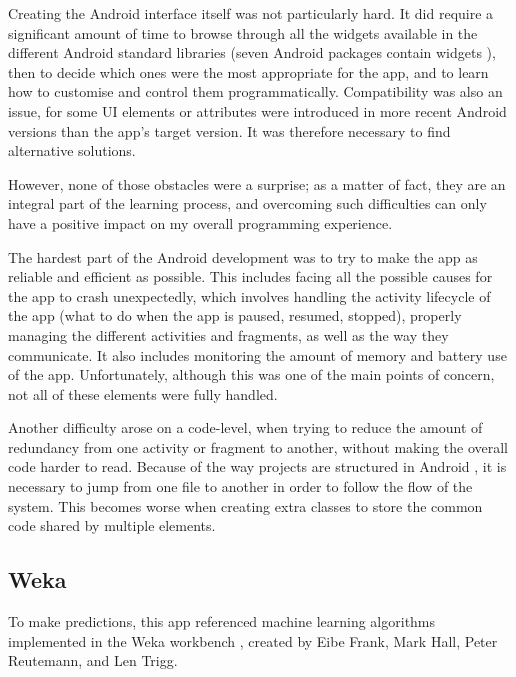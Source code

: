 \documentclass{mproj}
\begin{document}
Creating the Android interface itself was not particularly hard. It did require a significant amount of time to browse through all the widgets available in the different Android standard libraries (seven Android packages contain widgets \cite{androidpackages}), then to decide which ones were the most appropriate for the app, and to learn how to customise and control them programmatically. Compatibility was also an issue, for some UI elements or attributes were introduced in more recent Android versions than the app's target version. It was therefore necessary to find alternative solutions. \par

However, none of those obstacles were a surprise; as a matter of fact, they are an integral part of the learning process, and overcoming such difficulties can only have a positive impact on my overall programming experience. \par

The hardest part of the Android development was to try to make the app as reliable and efficient as possible. This includes facing all the possible causes for the app to crash unexpectedly, which involves handling the activity lifecycle of the app \cite{androidlifecycle} (what to do when the app is paused, resumed, stopped), properly managing the different activities and fragments, as well as the way they communicate. It also includes monitoring the amount of memory and battery use of the app.
Unfortunately, although this was one of the main points of concern, not all of these elements were fully handled. \par

Another difficulty arose on a code-level, when trying to reduce the amount of redundancy from one activity or fragment to another, without making the overall code harder to read. Because of the way projects are structured in Android \cite{androidprojects}, it is necessary to jump from one file to another in order to follow the flow of the system. This becomes worse when creating extra classes to store the common code shared by multiple elements.

\subsection{Weka}

To make predictions, this app referenced machine learning algorithms implemented in the Weka workbench \cite{weka}, created by Eibe Frank, Mark Hall, Peter Reutemann, and Len Trigg.
\end{document}

